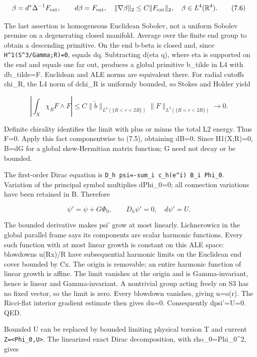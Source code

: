 \documentclass[
  10pt,
]{article}
\begin{document}
\[
        \beta=d^*\Delta^{-1}F_{\rm ext},\qquad
        d\beta=F_{\rm ext},\quad
        \|\nabla\beta\|_2\le C\|F_{\rm ext}\|_2,
        \quad\beta\in L^4(\mathbb R^4).              \tag{7.6}
\]

The last assertion is homogeneous Euclidean Sobolev, not a uniform
Sobolev premise on a degenerating closed manifold. Average over the
finite end group to obtain a descending primitive. On the end b-beta is
closed and, since \texttt{H\^{}1(S\^{}3/Gamma;R)=0}, equals dq.
Subtracting d(eta q), where eta is supported on the end and equals one
far out, produces a global primitive b\_tilde in L4 with db\_tilde=F.
Euclidean and ALE norms are equivalent there. For radial cutoffs chi\_R,
the L4 norm of dchi\_R is uniformly bounded, so Stokes and Holder yield

\[
 \left|\int_X\chi_R F\wedge F\right|
 \le C\|\tilde b\|_{L^4(\{R<r<2R\})}
         \|F\|_{L^2(\{R<r<2R\})}\longrightarrow0.   \tag{7.7}
\]

Definite chirality identifies the limit with plus or minus the total L2
energy. Thus F=0. Apply this fact componentwise to (7.5), obtaining
dB=0. Since H1(X;R)=0, B=dG for a global skew-Hermitian matrix function;
G need not decay or be bounded.

The first-order Dirac equation is
\texttt{D\_h\ psi=-sum\_i\ c\_h(e\^{}i)\ B\_i\ Phi\_0}. Variation of the
principal symbol multiplies dPhi\_0=0; all connection variations have
been retained in B. Therefore

\[
            \psi'=\psi+G\Phi_0,\qquad D_h\psi'=0,
                                    \quad d\psi'=U.  \tag{7.8}
\]

The bounded derivative makes psi' grow at most linearly. Lichnerowicz in
the global parallel frame says its components are scalar harmonic
functions. Every such function with at most linear growth is constant on
this ALE space: blowdowns u(Rx)/R have subsequential harmonic limits on
the Euclidean end cover bounded by C\textbar x\textbar. The origin is
removable; an entire harmonic function of linear growth is affine. The
limit vanishes at the origin and is Gamma-invariant, hence is linear and
Gamma-invariant. A nontrivial group acting freely on S3 has no fixed
vector, so the limit is zero. Every blowdown vanishes, giving u=o(r).
The Ricci-flat interior gradient estimate then gives du=0. Consequently
dpsi'=U=0. QED.

Bounded U can be replaced by bounded limiting physical torsion T and
current \texttt{Z=\textless{}Phi\_0,U\textgreater{}}. The linearized
exact Dirac decomposition, with rho\_0=\textbar Phi\_0\textbar\^{}2,
gives
\end{document}
